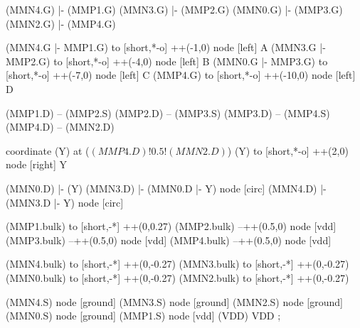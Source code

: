 \begin{circuitikz}[american]
	(MMN4.G) |- (MMP1.G)
	(MMN3.G) |- (MMP2.G)
	(MMN0.G) |- (MMP3.G)
	(MMN2.G) |- (MMP4.G)
	
	(MMN4.G |- MMP1.G) to [short,*-o] ++(-1,0) node [left] {A}
	(MMN3.G |- MMP2.G) to [short,*-o] ++(-4,0) node [left] {B}
	(MMN0.G |- MMP3.G) to [short,*-o] ++(-7,0) node [left] {C}
	(MMP4.G) to [short,*-o] ++(-10,0) node [left] {D}	
	
	(MMP1.D) -- (MMP2.S)
	(MMP2.D) -- (MMP3.S)	
	(MMP3.D) -- (MMP4.S)
	(MMP4.D) -- (MMN2.D)
	
	coordinate (Y) at ($(MMP4.D)!0.5!(MMN2.D)$)
	(Y) to [short,*-o] ++(2,0) node [right] {Y}
	
	(MMN0.D) |- (Y)
	(MMN3.D) |- (MMN0.D |- Y) node [circ] {}
	(MMN4.D) |- (MMN3.D |- Y) node [circ] {}
	
	(MMP1.bulk) to [short,-*] ++(0,0.27)
	(MMP2.bulk) --++(0.5,0) node [vdd] {}
	(MMP3.bulk) --++(0.5,0) node [vdd] {}
	(MMP4.bulk) --++(0.5,0) node [vdd] {}
	
	(MMN4.bulk) to [short,-*] ++(0,-0.27)
	(MMN3.bulk) to [short,-*] ++(0,-0.27)
	(MMN0.bulk) to [short,-*] ++(0,-0.27)
	(MMN2.bulk) to [short,-*] ++(0,-0.27)


	(MMN4.S) node [ground] {}
	(MMN3.S) node [ground] {}
	(MMN2.S) node [ground] {}
	(MMN0.S) node [ground] {}
	(MMP1.S) node [vdd] (VDD) {VDD}
;

\end{circuitikz}
